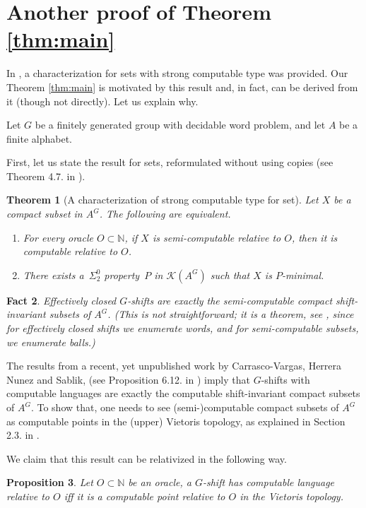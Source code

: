 \documentclass[french,american]{article}
\theoremstyle{plain}
\newtheorem{theorem}{Theorem}[section]
\newtheorem{proposition}[theorem]{Proposition}
\theoremstyle{definition}
\theoremstyle{remark}
\theoremstyle{plain}
\newtheorem{fact}[theorem]{Fact}
\begin{document}
\section{Another proof of Theorem \ref{thm:main}}\label{Appendix:Another-proof-of}

In \cite{AH22c}, a characterization for sets with strong computable
type was provided. Our Theorem \ref{thm:main} is motivated
by this result and, in fact, can be derived from it (though not directly).
Let us explain why.

Let $G$ be a finitely generated group with  decidable word problem,
and let $A$ be a finite alphabet.

First, let us state the result for sets, reformulated without using
copies (see Theorem 4.7. in \cite{AH22c}).
\begin{theorem}[A characterization of strong computable type for set]
\label{thm:SCTforsets}Let $X$ be a compact
subset in $A^{G}$. The following are equivalent.
\begin{enumerate}
\item For every oracle $O\subset\mathbb{N}$, if $X$ is semi-computable
relative to $O$, then it is computable relative to $O$.
\item There exists a~$\Sigma_{2}^{0}$ property~$P$ in $\mathcal{K}(A^{G})$
such that $X$ is $P$-minimal.
\end{enumerate}
\end{theorem}

\begin{fact}
\label{fact:Effective-semicomputable}Effectively closed $G$-shifts are exactly
the semi-computable compact shift-invariant subsets of $A^{G}$. (This is not straightforward; it is a theorem, see \cite{AUBRUN201735}, since
for effectively closed shifts we enumerate words, and for semi-computable subsets,
we enumerate balls.)
\end{fact}

The results from a recent, yet unpublished work by Carrasco-Vargas,
Herrera Nunez and Sablik, (see Proposition 6.12. in \cite{Phdnicanor2024})
imply that $G$-shifts with computable languages are exactly the computable
shift-invariant compact subsets of $A^{G}$. To show that, one needs to see
(semi-)computable compact subsets of $A^{G}$ as computable points in the
(upper) Vietoris topology, as explained in Section 2.3. in \cite{Phdamir2024}.

We claim that this result can be relativized in the following way.
\begin{proposition}
\label{prop:decidable-computable}Let $O\subset\mathbb{N}$ be an
oracle, a $G$-shift has computable language relative to $O$ iff
it is a computable point relative to $O$ in the Vietoris topology.
\end{proposition}
\end{document}
